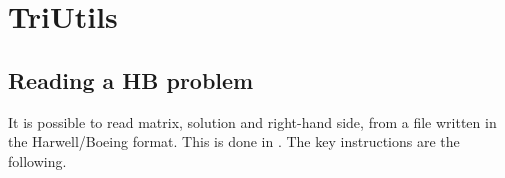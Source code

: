 % 
% 
% 
%   
%   
% 
% 

\section{TriUtils}
\label{chap:triutils}

\subsection{Reading a HB problem}

It is possible to read matrix, solution and right-hand side, from a file
written in the Harwell/Boeing format. This is done in \newline
{}. The key instructions are the following.

